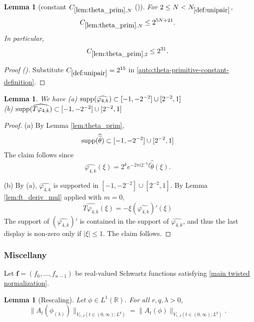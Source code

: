 \documentclass[12pt,reqno]{amsart}
\newcommand{\auto}{{({\tiny\faCar})}}
\theoremstyle{plain}
\newtheorem{lemma}[theorem]{Lemma}
\numberwithin{equation}{section}
\theoremstyle{remark}
\newcommand{\uses}[1]{}
\newcommand{\usesdefs}[1]{}
\begin{document}
\begin{lemma}[constant $C_{\ref{lem:theta_prim},N}$ \auto]\label{constant theta primitive}\uses{lem:theta_prim}\usesdefs{def:unipair}
For $2\le N<N_{\ref{def:unipair}}$,
\begin{equation}\label{constant theta primitive bound}
C_{\ref{lem:theta_prim},N}\le2^{5N+21}.
\end{equation}
In particular,
\begin{equation}\label{auto:constant-theta-primitive-two}
C_{\ref{lem:theta_prim},2}\le2^{31}.
\end{equation}
\end{lemma}
\begin{proof}[Proof \auto]
Substitute $C_{\ref{def:unipair}}=2^{15}$ in \eqref{auto:theta-primitive-constant-definition}.
\end{proof}

\begin{lemma}\label{lem:phi4_supp}\uses{lem:theta_prim,lem:ft_deriv_mul}\usesdefs{defn:window based bump functions} We have
(a) $\textup{supp}(\widehat{\varphi_{4,k}})
\subset  [-1,-2^{-2}]\cup [2^{-2},1]$\\

(b) $\textup{supp}(\widehat{T\varphi_{4,k}})
\subset  [-1,-2^{-2}]\cup [2^{-2},1]$
\end{lemma}
\begin{proof}
(a) By Lemma \ref{lem:theta_prim},
\[\textup{supp}(\widehat{\widetilde{\theta}}) \subset [-1,-2^{-2}]\cup [2^{-2},1]\]
The claim follows since
\[\widehat{\varphi_{4,k}}(\xi)=2^ke^{-2\pi i2^{-k}\xi}\widehat{\widetilde\theta}(\xi).  \]

(b) By (a), $\widehat{\varphi_{4,k}}$ is supported in
$ [-1,-2^{-2}]\cup [2^{-2},1] $.
  By Lemma \ref{lem:ft_deriv_mul} applied with $m=0$,
  \[\widehat{T\varphi_{4,k}}(\xi) = -\xi(\widehat{\varphi_{4,k}})'(\xi) \]
The support of $(\widehat{\varphi_{4,k}})'$ is contained in the support of $\widehat{\varphi_{4,k}}$, and thus the last display is non-zero only if  $|\xi|\le 1$. The claim follows.
\end{proof}

\subsubsection{Miscellany}
Let $\mathbf{f}=(f_0,\dots,f_{n-1})$ be real-valued Schwartz functions satisfying \eqref{main twisted normalization}.


\begin{lemma}[Rescaling]\label{lem:rescaling}\uses{}\usesdefs{A_def}Let $\phi\in L^1(\mathbb{R})$.
For all $r,q,\lambda>0$,
\begin{equation}\label{auto:variation-rescaling-invariance} \|A_t({\phi_{(\lambda)}})\|_{V_{r,J}(t\in (0,\infty); L^q)} =  \|A_t({\phi})\|_{V_{r,J}(t\in (0,\infty); L^q)}. \end{equation}
\end{lemma}
\end{document}
